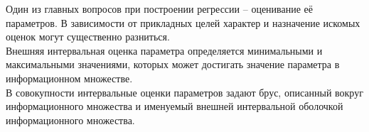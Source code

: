 Один из главных вопросов при построении регрессии -- оценивание её параметров. В зависимости от прикладных целей характер и назначение искомых оценок могут существенно разниться. \\
Внешняя интервальная оценка параметра определяется минимальными и максимальными значениями, которых может достигать значение параметра в информационном множестве. \\
В совокупности интервальные оценки параметров задают брус, описанный вокруг информационного множества и именуемый внешней интервальной оболочкой информационного множества. 






